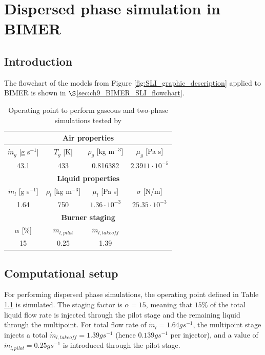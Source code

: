 \chapter{Dispersed phase simulation in BIMER}
	\label{ch9:BIMER_lagrangian}

\section{Introduction}

The flowchart of the models from Figure \ref{fig:SLI_graphic_description} applied to BIMER is shown in $\S$\ref{sec:ch9_BIMER_SLI_flowchart}.

\begin{table}[!h]
\centering
\caption{Operating point to perform gaseous and two-phase simulations tested by }
\begin{tabular}{|c|c|c|c|}
\hline
\multicolumn{4}{|c|}{\textbf{Air properties}} \\
\hline
$\dot{m}_g$ [g s$^{-1}$] & $T_g$ [K] & $\rho_g$ [kg m$^{-3}$]  & $\mu_g$ [Pa s]  \\
\hline
43.1 & 433 & 0.816382 & $2.3911 \cdot 10^{-5}$ \\
\hline
\hline
\multicolumn{4}{|c|}{\textbf{Liquid properties}} \\
\hline
$\dot{m}_l$ [g s$^{-1}$] & $\rho_l$ [kg m$^{-3}]$   & $\mu_l$ [Pa s]   & $\sigma$ [N/m]   \\
\hline
1.64 & 750 & $1.36 \cdot 10^{-3}$ & $25.35 \cdot 10^{-3}$ \\
\hline
\hline
\multicolumn{4}{|c|}{\textbf{Burner staging}} \\
\hline
$\alpha$ [$\%$] & $\dot{m}_{l,pilot}$ & $\dot{m}_{l,takeoff}$ & \\
\hline
15 & 0.25 & 1.39 & \\
\hline
\end{tabular}
\label{tab:liquid_operating_point_Renaud}
\end{table}




\section{Computational setup}

For performing dispersed phase simulations, the operating point defined in Table \ref{tab:liquid_operating_point_Renaud} is simulated. The staging factor is $\alpha = 15$, meaning that $15 \%$ of the total liquid flow rate is injected through the pilot stage and the remaining liquid through the multipoint. For total flow rate of $\dot{m}_l = 1.64 g s^{-1}$, the multipoint stage injects a total $\dot{m}_{l,takeoff} = 1.39 g s^{-1}$ (hence $0.139 g s^{-1}$ per injector), and a value of $\dot{m}_{l,pilot} = 0.25 g s^{-1}$ is introduced through the pilot stage.

